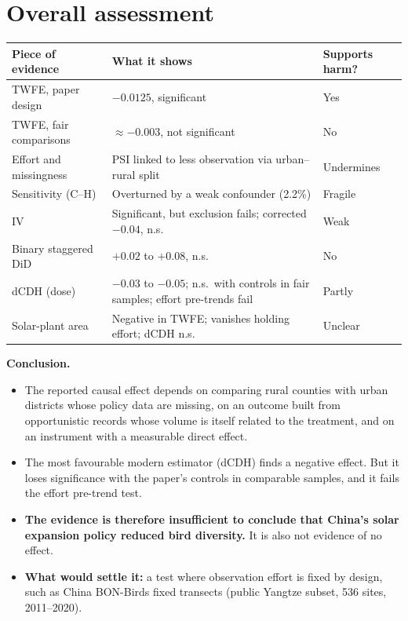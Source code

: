 \documentclass[11pt]{article}
\begin{document}
\section{Overall assessment}
\begin{center}\small
\begin{tabularx}{\linewidth}{>{\raggedright\arraybackslash}p{4.1cm} >{\raggedright\arraybackslash}X >{\centering\arraybackslash}p{2.3cm}}
\toprule
Piece of evidence & What it shows & Supports harm? \\
\midrule
TWFE, paper design & $-0.0125$, significant & Yes \\
TWFE, fair comparisons & $\approx -0.003$, not significant & No \\
Effort and missingness & PSI linked to less observation via urban--rural split & Undermines \\
Sensitivity (C--H) & Overturned by a weak confounder (2.2\%) & Fragile \\
IV & Significant, but exclusion fails; corrected $-0.04$, n.s. & Weak \\
Binary staggered DiD & $+0.02$ to $+0.08$, n.s. & No \\
dCDH (dose) & $-0.03$ to $-0.05$; n.s.\ with controls in fair samples; effort pre-trends fail & Partly \\
Solar-plant area & Negative in TWFE; vanishes holding effort; dCDH n.s. & Unclear \\
\bottomrule
\end{tabularx}
\end{center}

\begin{answerbox}
\textbf{Conclusion.}
\begin{itemize}[leftmargin=14pt,itemsep=1pt,topsep=2pt]
\item The reported causal effect depends on comparing rural counties with urban districts whose policy data are missing, on an outcome built from opportunistic records whose volume is itself related to the treatment, and on an instrument with a measurable direct effect.
\item The most favourable modern estimator (dCDH) finds a negative effect. But it loses significance with the paper's controls in comparable samples, and it fails the effort pre-trend test.
\item \textbf{The evidence is therefore insufficient to conclude that China's solar expansion policy reduced bird diversity.} It is also not evidence of no effect.
\item \textbf{What would settle it:} a test where observation effort is fixed by design, such as China BON-Birds fixed transects (public Yangtze subset, 536 sites, 2011--2020).
\end{itemize}
\end{answerbox}
\end{document}
